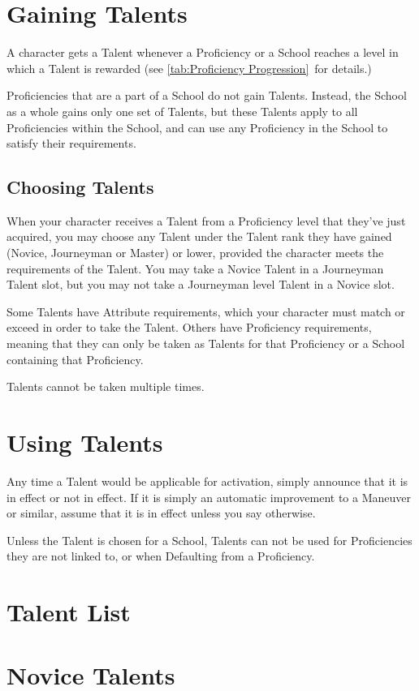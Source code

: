 \documentclass[oneside,11pt,english]{book}
\begin{document}
\section{Gaining Talents}
A character gets a Talent whenever a Proficiency or a School reaches a level in which a Talent is 
rewarded (see \autoref{tab:Proficiency Progression}~for details.)

Proficiencies that are a part of a School do not gain Talents. Instead, the School as a whole gains only one 
set of Talents, but these Talents apply to all Proficiencies within the School, and can use any Proficiency 
in the School to satisfy their requirements. 

\subsection{Choosing Talents}
When your character receives a Talent from a Proficiency level that they’ve just acquired, you may choose any Talent under the Talent rank they have gained (Novice, Journeyman or Master) or lower, provided the character meets the requirements of the Talent. You may take a Novice Talent in a Journeyman Talent slot, but you may not take a Journeyman level Talent in a Novice slot.

Some Talents have Attribute requirements, which your character must match or exceed in order to take the Talent. Others have Proficiency requirements, meaning that they can only be taken as Talents for that Proficiency or a School containing that Proficiency.

Talents cannot be taken multiple times.

\section{Using Talents}
Any time a Talent would be applicable for activation, simply announce that it is in effect or not in effect.
If it is simply an automatic improvement to a Maneuver or similar, assume that it is in effect unless you say otherwise. 

Unless the Talent is chosen for a School, Talents can not be used for Proficiencies they are not linked to, or when Defaulting from a Proficiency. 

\section*{Talent List}
\section{Novice Talents}\label{sec:Novice Talents}
\end{document}
